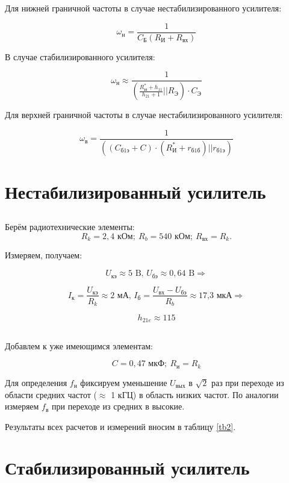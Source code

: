 \documentclass[13pt,a4paper]{article}
\begin{document}
Для нижней граничной частоты в случае нестабилизированного усилителя:

\[ \omega_н = \frac{1}{C_Б(R_{И} + R_{вх})} \]

В случае стабилизированного усилителя:

\[  \omega_н \approx \frac{1}{\left(\frac{R_И^{*} + h_{11}}{h_{21} + 1} || R_Э\right) \cdot C_Э}   \]

Для верхней граничной частоты в случае нестабилизированного усилителя:

\[ \omega_в = \frac{1}{ \left( \left(  C_{б1э} + C  \right) \cdot (R_{И}^{*} + r_{б1б}) || r_{б1э}     \right)  } \]

\section{Нестабилизированный усилитель}

\subsection{}

Берём радиотехнические элементы:
\[ R_k = 2,4 \text{ кОм};\ R_b = 540 \text{ кОм};\ R_{вх} = R_k.\]

Измеряем, получаем: 

\[ U_{кэ} \approx 5 \text{ B, } U_{бэ} \approx 0,64 \text{ B} \Rightarrow  \]

\[ I_{к} = \frac{U_{кэ}}{R_k} \approx 2 \text{ мА, } I_{б} = \frac{U_{вх} - U_{бэ}}{R_b} \approx  \text{17,3 мкА} \Rightarrow  \]

\[ h_{21e} \approx 115 \]

\subsection{}

Добавлем к уже имеющимся элементам:

\[C = 0,47 \text{ мкФ};\ R_{и} = R_k\]

Для определения $f_н$ фиксируем уменьшение $U_{вых}$ в $\sqrt{2}$ раз при переходе из области средних частот ($\approx$ 1 кГЦ) в область низких частот.
По аналогии измеряем $f_в$ при переходе из средних в высокие.
 
Результаты всех расчетов и измерений вносим в таблицу \ref{tb2}.

\section{Стабилизированный усилитель}
\end{document}
